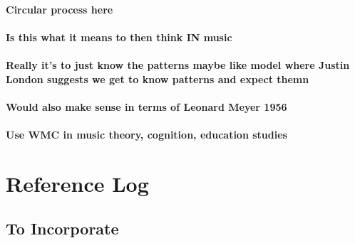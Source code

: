 \documentclass[]{book}
\theoremstyle{definition}
\theoremstyle{definition}
\theoremstyle{definition}
\theoremstyle{remark}
\begin{document}
\hypertarget{circular-process-here}{%
\subsubsection{Circular process here}\label{circular-process-here}}

\hypertarget{is-this-what-it-means-to-then-think-in-music}{%
\subsubsection{Is this what it means to then think IN
music}\label{is-this-what-it-means-to-then-think-in-music}}

\hypertarget{really-its-to-just-know-the-patterns-maybe-like-model-where-justin-london-suggests-we-get-to-know-patterns-and-expect-themn}{%
\subsubsection{Really it's to just know the patterns maybe like model
where Justin London suggests we get to know patterns and expect
themn}\label{really-its-to-just-know-the-patterns-maybe-like-model-where-justin-london-suggests-we-get-to-know-patterns-and-expect-themn}}

\hypertarget{would-also-make-sense-in-terms-of-leonard-meyer-1956}{%
\subsubsection{Would also make sense in terms of Leonard Meyer
1956}\label{would-also-make-sense-in-terms-of-leonard-meyer-1956}}

\hypertarget{use-wmc-in-music-theory-cognition-education-studies}{%
\subsubsection{Use WMC in music theory, cognition, education
studies}\label{use-wmc-in-music-theory-cognition-education-studies}}

\hypertarget{reference-log}{%
\chapter{Reference Log}\label{reference-log}}

\hypertarget{to-incorporate}{%
\section{To Incorporate}\label{to-incorporate}}
\end{document}
